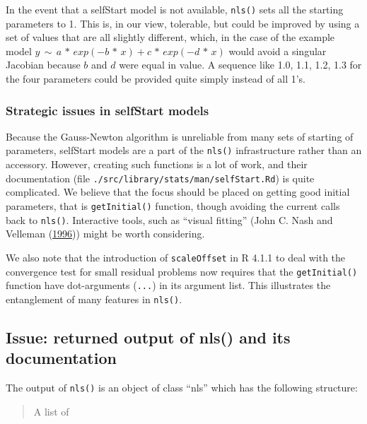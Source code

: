 \documentclass[
]{article}
\begin{document}
In the event that a selfStart model is not available, \texttt{nls()}
sets all the starting parameters to 1. This is, in our view, tolerable,
but could be improved by using a set of values that are all slightly
different, which, in the case of the example model
\(y \,\sim\, a \,*\, exp(-b \,*\, x) + c\,*\,exp(-d \,*\, x)\) would
avoid a singular Jacobian because \(b\) and \(d\) were equal in value. A
sequence like 1.0, 1.1, 1.2, 1.3 for the four parameters could be
provided quite simply instead of all 1's.

\hypertarget{strategic-issues-in-selfstart-models}{%
\subsubsection{Strategic issues in selfStart
models}\label{strategic-issues-in-selfstart-models}}

Because the Gauss-Newton algorithm is unreliable from many sets of
starting of parameters, selfStart models are a part of the
\texttt{nls()} infrastructure rather than an accessory. However,
creating such functions is a lot of work, and their documentation (file
\texttt{./src/library/stats/man/selfStart.Rd}) is quite complicated. We
believe that the focus should be placed on getting good initial
parameters, that is \texttt{getInitial()} function, though avoiding the
current calls back to \texttt{nls()}. Interactive tools, such as
``visual fitting'' (John C. Nash and Velleman
(\protect\hyperlink{ref-nash1996nonlinear}{1996})) might be worth
considering.

We also note that the introduction of \texttt{scaleOffset} in R 4.1.1 to
deal with the convergence test for small residual problems now requires
that the \texttt{getInitial()} function have dot-arguments
(\texttt{...}) in its argument list. This illustrates the entanglement
of many features in \texttt{nls()}.

\hypertarget{issue-returned-output-of-nls-and-its-documentation}{%
\subsection{Issue: returned output of nls() and its
documentation}\label{issue-returned-output-of-nls-and-its-documentation}}

The output of \texttt{nls()} is an object of class ``nls'' which has the
following structure:

\begin{quote}
A list of
\end{quote}
\end{document}
